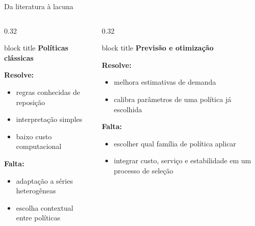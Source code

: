 \begin{frame}{Da literatura à lacuna}
  \tiny
  \setlength{\leftmargini}{1.0em}
  \begin{columns}[t,onlytextwidth]
    \begin{column}{0.32\linewidth}
      \tabstyle
      \begin{beamercolorbox}[wd=\linewidth,sep=0.35em,rounded=true]{block title}
        \scriptsize\textbf{Políticas clássicas}
      \end{beamercolorbox}
      \vspace{0.3em}
      \textbf{Resolve:}
      \begin{itemize}\setlength\itemsep{0pt}\setlength\parskip{0pt}
        \item regras conhecidas de reposição
        \item interpretação simples
        \item baixo custo computacional
      \end{itemize}
      \textbf{Falta:}
      \begin{itemize}\setlength\itemsep{0pt}\setlength\parskip{0pt}
        \item adaptação a séries heterogêneas
        \item escolha contextual entre políticas
      \end{itemize}
    \end{column}
    \begin{column}{0.32\linewidth}
      \tabstyle
      \begin{beamercolorbox}[wd=\linewidth,sep=0.35em,rounded=true]{block title}
        \scriptsize\textbf{Previsão e otimização}
      \end{beamercolorbox}
      \vspace{0.3em}
      \textbf{Resolve:}
      \begin{itemize}\setlength\itemsep{0pt}\setlength\parskip{0pt}
        \item melhora estimativas de demanda
        \item calibra parâmetros de uma política já escolhida
      \end{itemize}
      \textbf{Falta:}
      \begin{itemize}\setlength\itemsep{0pt}\setlength\parskip{0pt}
        \item escolher qual família de política aplicar
        \item integrar custo, serviço e estabilidade em um processo de seleção

\end{itemize}
\end{column}
\end{columns}
\end{frame}

